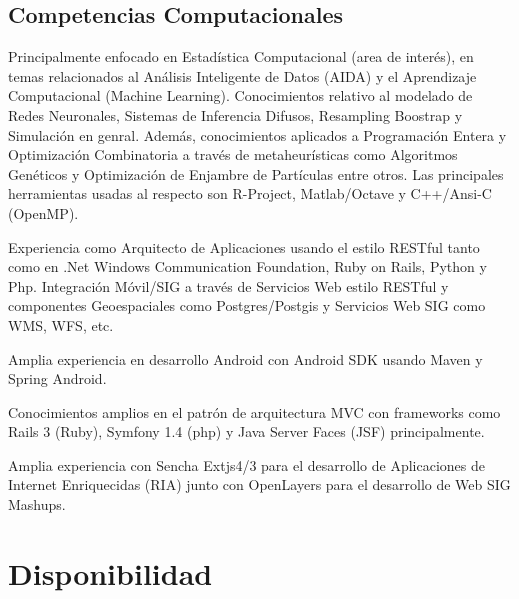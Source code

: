 \documentclass[11pt,letterpaper,roman]{moderncv}
\begin{document}
\subsection{Competencias Computacionales}  {Principalmente enfocado en Estadística Computacional (area de
interés), en temas relacionados al Análisis Inteligente de Datos (AIDA) y el
Aprendizaje Computacional (Machine Learning). Conocimientos relativo al modelado
de Redes Neuronales, Sistemas de Inferencia Difusos, Resampling Boostrap y
Simulación en genral. Además, conocimientos aplicados a Programación Entera y
Optimización Combinatoria a través de metaheurísticas como Algoritmos Genéticos
y Optimización de Enjambre de Partículas entre otros. Las principales
herramientas usadas al respecto son R-Project, Matlab/Octave y C++/Ansi-C
(OpenMP).}

 {Experiencia como Arquitecto de
Aplicaciones usando el estilo RESTful tanto como en .Net Windows Communication
Foundation, Ruby on Rails, Python y Php. Integración Móvil/SIG a través de
Servicios Web estilo RESTful y componentes Geoespaciales como Postgres/Postgis y
Servicios Web SIG como WMS, WFS, etc.}
	

 {Amplia experiencia en desarrollo Android con Android
SDK usando Maven y Spring Android.}

 {Conocimientos amplios en el patrón de arquitectura
MVC con frameworks como Rails 3 (Ruby), Symfony 1.4 (php) y Java Server Faces
(JSF) principalmente.}


 {Amplia experiencia con Sencha Extjs4/3 para el
desarrollo de Aplicaciones de Internet Enriquecidas (RIA) junto con OpenLayers
para el desarrollo de Web SIG Mashups. }

\section{Disponibilidad}  
\end{document}

